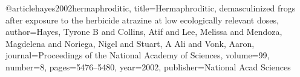 @article{hayes2002hermaphroditic,
  title={Hermaphroditic, demasculinized frogs after exposure to the herbicide atrazine at low ecologically relevant doses},
  author={Hayes, Tyrone B and Collins, Atif and Lee, Melissa and Mendoza, Magdelena and Noriega, Nigel and Stuart, A Ali and Vonk, Aaron},
  journal={Proceedings of the National Academy of Sciences},
  volume={99},
  number={8},
  pages={5476--5480},
  year={2002},
  publisher={National Acad Sciences}
}
